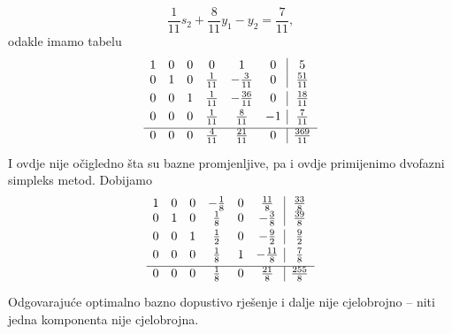 \documentclass[a4paper, utf8, 11pt, colorlinks]{book}
\theoremstyle{definition}
\begin{document}
 $$ \frac{1}{11} s_2 + \frac{8}{11} y_1 - y_2 = \frac{7}{11},$$
 odakle imamo tabelu 
 $$\begin{array}{cccccc| c}
 1   &   0   &  0  &   0             &   1  &   0              &   5 \\\vspace{1mm}
 0   &   1   &  0  &  \frac{1}{11}    &   -\frac{3}{11}    &  0 & \frac{51}{11} \\\vspace{1mm}
 0   &   0   &  1  &  \frac{1}{11}    & -\frac{36}{11}       & 0 & \frac{18}{11}  \\\vspace{1mm}
 0   &   0   &  0  &  \frac{1}{11}    &  \frac{8}{11}   & -1 & \frac{7}{11} \\ \hline\vspace{1mm}
 0   &   0   &  0  &   \frac{4}{11}   &   \frac{21}{11} & 0 & \frac{369}{11}
\end{array} $$
I ovdje nije očigledno šta su bazne promjenljive, pa i ovdje primijenimo dvofazni simpleks metod. Dobijamo 
 $$\begin{array}{cccccc| c}
1    &   0   &   0   &  -\frac{1}{8}   &   0    &    \frac{11}{8}    &  \frac{33}{8} \\\vspace{1mm}
0    &   1   &   0   &   \frac{1}{8}   &   0    &    -\frac{3}{8}    & \frac{39}{8} \\\vspace{1mm}
0    &   0   &   1   &   \frac{1}{2}   &   0    &    - \frac{9}{2}   & \frac{9}{2} \\\vspace{1mm}
0    &   0   &   0   &   \frac{1}{8}   &   1    &    - \frac{11}{8}  & \frac{7}{8} \\ \hline\vspace{1mm}
0    &   0   &   0   &   \frac{1}{8}   &   0    &     \frac{21}{8}   & \frac{255}{8}
\end{array} $$
Odgovarajuće optimalno bazno dopustivo rješenje i dalje nije cjelobrojno -- niti jedna komponenta nije cjelobrojna. 
\end{document}
